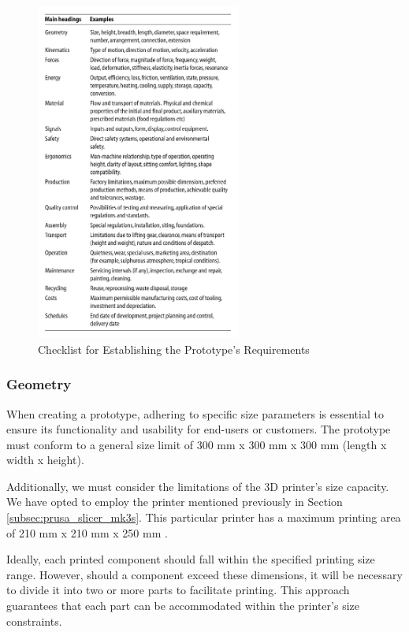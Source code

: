 \begin{figure}[ht!]
    \centering
    \includegraphics[width=0.6\textwidth]{texs/Part1/chapter2/image/requirements.png}
    \caption{Checklist for Establishing the Prototype's Requirements \cite[149]{Pahl2007}}
    \label{fig:checklist}
\end{figure}

\subsubsection{Geometry}
When creating a prototype, adhering to specific size parameters is essential to ensure its functionality and usability for end-users or customers. The prototype must conform to a general size limit of 300 mm x 300 mm x 300 mm (length x width x height).

Additionally, we must consider the limitations of the 3D printer's size capacity. We have opted to employ the printer mentioned previously in Section \ref{subsec:prusa_slicer_mk3s}. This particular printer has a maximum printing area of 210 mm x 210 mm x 250 mm \cite{Prusa}.

Ideally, each printed component should fall within the specified printing size range. However, should a component exceed these dimensions, it will be necessary to divide it into two or more parts to facilitate printing. This approach guarantees that each part can be accommodated within the printer's size constraints.

